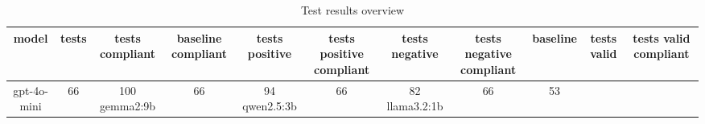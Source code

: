 
  \begin{table}[h!]
  \centering
  \begin{tabular}{|c|c|c|c|c|c|c|c|c|c|c|}
  \hline
  model & tests & tests compliant & baseline compliant & tests positive & tests positive compliant & tests negative & tests negative compliant & baseline & tests valid & tests valid compliant \\
  \hline
  gpt-4o-mini & 66 & 100%
\hline
gemma2:9b & 66 & 94%
\hline
qwen2.5:3b & 66 & 82%
\hline
llama3.2:1b & 66 & 53%
  \end{tabular}
  \caption{Test results overview}
  
  \end{table}
  